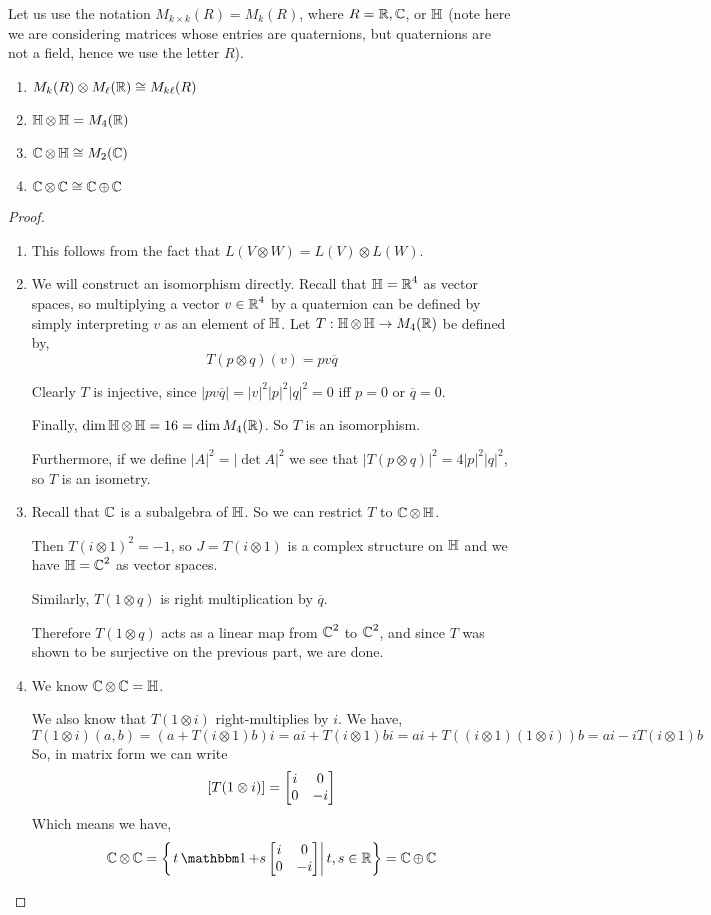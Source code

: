 \begin{lemma}
Let us use the notation $M_{k\times k}(R) = M_{k}(R)$, where $R = \operatorname{\mathbb{R}},\operatorname{\mathbb{C}}$, or $\operatorname{\mathbb{H}}$ (note here we are considering matrices whose entries are quaternions, but quaternions are not a field, hence we use the letter $R$).
\begin{enumerate}[(1)]
\item $M_k(R)\otimes M_\ell(\operatorname{\mathbb{R}}) \cong M_{k\ell}(R)$
\item $\operatorname{\mathbb{H}}\otimes\operatorname{\mathbb{H}} = M_4(\operatorname{\mathbb{R}})$
\item $\operatorname{\mathbb{C}}\otimes \operatorname{\mathbb{H}}\cong M_2(\operatorname{\mathbb{C}})$
\item $\operatorname{\mathbb{C}}\otimes \operatorname{\mathbb{C}} \cong \operatorname{\mathbb{C}}\oplus \operatorname{\mathbb{C}}$
\end{enumerate}
\end{lemma}
\begin{proof}
\begin{enumerate}[(1)]
\item {
This follows from the fact that $L(V\otimes W) = L(V)\otimes L(W)$.
}
\item {
We will construct an isomorphism directly. Recall that $\operatorname{\mathbb{H}} = \operatorname{\mathbb{R}}^4$ as vector spaces, so multiplying a vector $v\in \operatorname{\mathbb{R}}^4$ by a quaternion can be defined by simply interpreting $v$ as an element of $\operatorname{\mathbb{H}}$. Let $T : \operatorname{\mathbb{H}}\otimes \operatorname{\mathbb{H}} \to M_4(\operatorname{\mathbb{R}})$ be defined by,
\[T(p\otimes q)(v) = pv\overline{q}\]

Clearly $T$ is injective, since $|pv\overline{q}| = |v|^2 |p|^2|q|^2 =0 $ iff $p=0$ or $\overline{q}=0$.

Finally, $\dim \operatorname{\mathbb{H}}\otimes \operatorname{\mathbb{H}} = 16 = \dim M_4(\operatorname{\mathbb{R}})$. So $T$ is an isomorphism.

Furthermore, if we define $|A|^2 = |\det A|^2$ we see that $|T(p\otimes q)|^2 = 4|p|^2|q|^2$, so $T$ is an isometry.
}
\item {
Recall that $\operatorname{\mathbb{C}}$ is a subalgebra of $\operatorname{\mathbb{H}}$. So we can restrict $T$ to $\operatorname{\mathbb{C}}\otimes \operatorname{\mathbb{H}}$. 

Then $T(i\otimes 1)^2 = -1$, so $J=T(i\otimes 1)$ is a complex structure on $\operatorname{\mathbb{H}}$ and we have $\operatorname{\mathbb{H}} = \operatorname{\mathbb{C}}^2$ as vector spaces.

Similarly, $T(1\otimes q)$ is right multiplication by $\overline{q}$.

Therefore $T(1\otimes q)$ acts as a linear map from $\operatorname{\mathbb{C}}^2$ to $\operatorname{\mathbb{C}}^2$, and since $T$ was shown to be surjective on the previous part, we are done.
}
\item {
We know $\operatorname{\mathbb{C}}\otimes \operatorname{\mathbb{C}}=\operatorname{\mathbb{H}}$.

We also know that $T(1\otimes i)$ right-multiplies by $i$. We have,
\[T(1\otimes i)(a,b) = (a+T(i\otimes 1)b)i = ai + T(i\otimes 1)bi = ai + T((i\otimes 1)(1\otimes i))b = ai -iT(i\otimes 1)b\]
So, in matrix form we can write
\[[T(1\otimes i)] = \begin{bmatrix}i&0\\0&-i\end{bmatrix}\]
Which means we have,
\[\CC\otimes \CC = \left\{\left.t\One +s\m{i&0\\0&-i} \right| t,s\in\RR\right\}=\CC\oplus\CC\]
}
\end{enumerate}

\end{proof}
